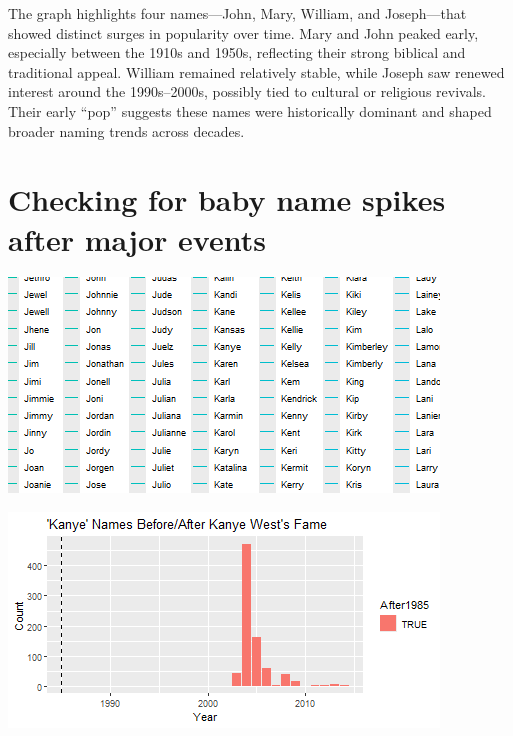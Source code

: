 \documentclass[11pt,preprint]{elsarticle}
\let\origfigure\figure
\let\endorigfigure\endfigure
\renewenvironment{figure}[1][2] {
    \expandafter\origfigure\expandafter[H]
} {
    \endorigfigure
}
\numberwithin{equation}{section}
\numberwithin{figure}{section}
\numberwithin{table}{section}
\begin{document}
The graph highlights four names---John, Mary, William, and Joseph---that
showed distinct surges in popularity over time. Mary and John peaked
early, especially between the 1910s and 1950s, reflecting their strong
biblical and traditional appeal. William remained relatively stable,
while Joseph saw renewed interest around the 1990s--2000s, possibly tied
to cultural or religious revivals. Their early ``pop'' suggests these
names were historically dominant and shaped broader naming trends across
decades.

\newpage

\section{Checking for baby name spikes after major
events}\label{checking-for-baby-name-spikes-after-major-events}

\begin{figure}[H]

{\centering \includegraphics{23034103_Q1USbabynames_files/figure-latex/Figure 3a-1} 

}

\caption{Caption Here \label{Figure1}}\label{fig:Figure 3a-1}
\end{figure}
\begin{figure}[H]

{\centering \includegraphics{23034103_Q1USbabynames_files/figure-latex/Figure 3a-2} 

}

\caption{Caption Here \label{Figure1}}\label{fig:Figure 3a-2}
\end{figure}
\end{document}
